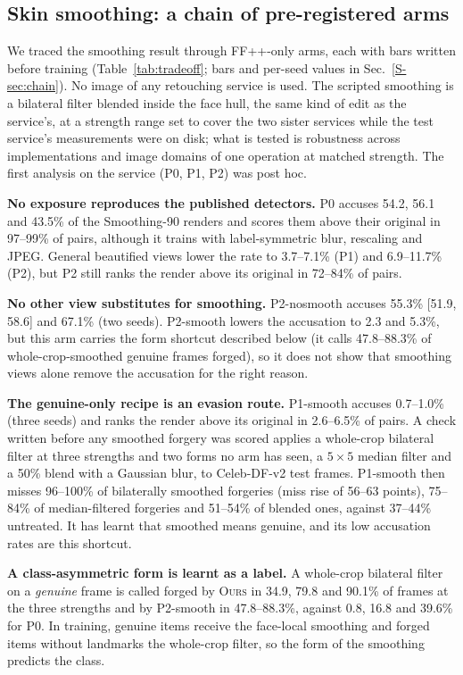 \documentclass[conference]{IEEEtran}
\newcommand{\ours}{\textsc{Ours}}
\begin{document}
\subsection{Skin smoothing: a chain of pre-registered arms}
\label{sec:chain}
We traced the smoothing result through FF++-only arms, each with bars written before training
(Table~\ref{tab:tradeoff}; bars and per-seed values in Sec.~\ref{S-sec:chain}). No image of any retouching service is used.
The scripted smoothing is a bilateral filter blended inside the face hull, the same kind of edit as the service's, at a strength
range set to cover the two sister services while the test service's measurements were on disk; what is tested is robustness
across implementations and image domains of one operation at matched strength. The first analysis on the service (P0, P1, P2)
was post hoc.

\textbf{No exposure reproduces the published detectors.} P0 accuses 54.2, 56.1 and 43.5\% of the Smoothing-90 renders and
scores them above their original in 97--99\% of pairs, although it trains with label-symmetric blur, rescaling and JPEG.
General beautified views lower the rate to 3.7--7.1\% (P1) and 6.9--11.7\% (P2), but P2 still ranks the render above its
original in 72--84\% of pairs.

\textbf{No other view substitutes for smoothing.} P2-nosmooth accuses 55.3\% [51.9, 58.6] and 67.1\% (two seeds). P2-smooth
lowers the accusation to 2.3 and 5.3\%, but this arm carries the form shortcut described below (it calls 47.8--88.3\% of
whole-crop-smoothed genuine frames forged), so it does not show that smoothing views alone remove the accusation for the right
reason.

\textbf{The genuine-only recipe is an evasion route.} P1-smooth accuses 0.7--1.0\% (three seeds) and ranks the render above
its original in 2.6--6.5\% of pairs. A check written before any smoothed forgery was scored applies a whole-crop bilateral
filter at three strengths and two forms no arm has seen, a $5\times5$ median filter and a 50\% blend with a Gaussian blur, to
Celeb-DF-v2 test frames. P1-smooth then misses 96--100\% of bilaterally smoothed forgeries (miss rise of 56--63 points),
75--84\% of median-filtered forgeries and 51--54\% of blended ones, against 37--44\% untreated. It has learnt that
smoothed means genuine, and its low accusation rates are this shortcut.

\textbf{A class-asymmetric form is learnt as a label.} A whole-crop bilateral filter on a \emph{genuine} frame is called forged
by \ours{} in 34.9, 79.8 and 90.1\% of frames at the three strengths and by P2-smooth in 47.8--88.3\%, against 0.8, 16.8 and
39.6\% for P0. In training, genuine items receive the face-local smoothing and forged items without landmarks the whole-crop
filter, so the form of the smoothing predicts the class.
\end{document}
